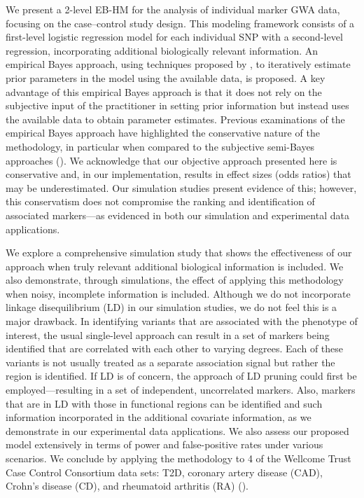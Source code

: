 We present a 2-level EB-HM for the analysis of individual
marker GWA data, focusing on the case--control study design.
This modeling framework consists of a first-level logistic
regression model for each individual SNP with a second-level
regression, incorporating additional biologically relevant
information. An empirical Bayes approach, using techniques
proposed by
\citet{Barlow:1972},
to iteratively estimate prior parameters in the model using
the available data, is proposed. A key advantage of this
empirical Bayes approach is that it does not rely on the
subjective input of the practitioner in setting prior
information but instead uses the available data to obtain
parameter estimates. Previous examinations of the empirical
Bayes approach have highlighted the conservative nature of
the methodology, in particular when compared to the subjective
semi-Bayes approaches
(\citealp{Castelloe_Zimmerman:2002,Schwender:2007}).
We acknowledge that our objective approach presented here
is conservative and, in our implementation, results in
effect sizes (odds ratios) that may be underestimated. Our
simulation studies present evidence of this; however, this
conservatism does not compromise the ranking and identification
of associated markers---as evidenced in both our simulation and
experimental data applications.

We explore a comprehensive simulation study that shows the
effectiveness of our approach when truly relevant additional
biological information is included. We also demonstrate, through
simulations, the effect of applying this methodology when noisy,
incomplete information is included. Although we do not incorporate
linkage disequilibrium (LD) in our simulation studies, we do not
feel this is a major drawback. In identifying variants that are
associated with the phenotype of interest, the usual single-level
approach can result in a set of markers being identified that are
correlated with each other to varying degrees. Each of these
variants is not usually treated as a separate association signal
but rather the region is identified. If LD is of concern, the
approach of LD pruning could first be employed---resulting in a
set of independent, uncorrelated markers. Also, markers that are
in LD with those in functional regions can be identified and such
information incorporated in the additional covariate information,
as we demonstrate in our experimental data applications. We also
assess our proposed model extensively in terms of power and
false-positive rates under various scenarios. We conclude by
applying the methodology to 4 of the Wellcome Trust Case
Control Consortium data sets: T2D, coronary artery disease
(CAD), Crohn's disease (CD), and rheumatoid arthritis (RA)
(\citealp{allison2006}).


